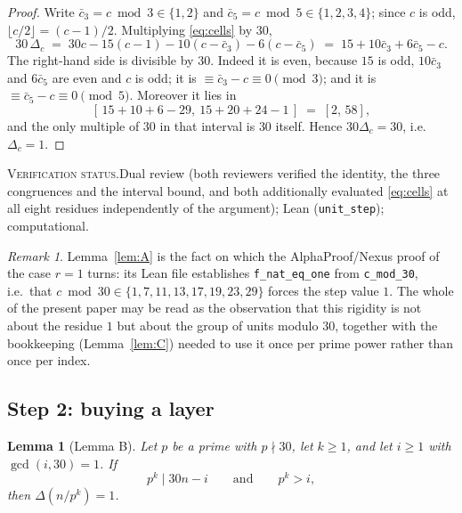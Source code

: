\documentclass[11pt]{article}
\theoremstyle{plain}
\newtheorem{lemma}[theorem]{Lemma}
\theoremstyle{definition}
\theoremstyle{remark}
\newtheorem*{remark}{Remark}
\numberwithin{equation}{section}
\newcommand{\vstatus}[1]{%
  \par\vspace{3pt}\noindent
  {\small\textsc{Verification status.}\enspace #1}\par\vspace{3pt}}
\begin{document}
\begin{proof}
Write $\bar c_3 = c \bmod 3 \in \{1,2\}$ and $\bar c_5 = c \bmod 5 \in \{1,2,3,4\}$; since $c$ is
odd, $\lfloor c/2\rfloor = (c-1)/2$. Multiplying \eqref{eq:cells} by $30$,
\[
  30\,\Delta_c \;=\; 30c - 15(c-1) - 10(c - \bar c_3) - 6(c - \bar c_5)
  \;=\; 15 + 10\bar c_3 + 6\bar c_5 - c .
\]
The right-hand side is divisible by $30$. Indeed it is even, because $15$ is odd, $10\bar c_3$
and $6\bar c_5$ are even and $c$ is odd; it is $\equiv \bar c_3 - c \equiv 0 \pmod 3$; and it is
$\equiv \bar c_5 - c \equiv 0 \pmod 5$. Moreover it lies in
\[
  [\,15 + 10 + 6 - 29,\ 15 + 20 + 24 - 1\,] \;=\; [2,\,58],
\]
and the only multiple of $30$ in that interval is $30$ itself. Hence $30\Delta_c = 30$, i.e.\
$\Delta_c = 1$.
\end{proof}
\vstatus{Dual review (both reviewers verified the identity, the three congruences and the
interval bound, and both additionally evaluated \eqref{eq:cells} at all eight residues
independently of the argument); Lean (\texttt{unit\_step}); computational.}

\begin{remark}
Lemma~\ref{lem:A} is the fact on which the AlphaProof/Nexus proof of the case $r=1$ turns: its
Lean file establishes \texttt{f\_nat\_eq\_one} from \texttt{c\_mod\_30}, i.e.\ that
$c \bmod 30 \in \{1,7,11,13,17,19,23,29\}$ forces the step value $1$. The whole of the present
paper may be read as the observation that this rigidity is not about the residue $1$ but about
the group of units modulo $30$, together with the bookkeeping (Lemma~\ref{lem:C}) needed to use
it once per prime power rather than once per index.
\end{remark}

\subsection{Step 2: buying a layer}

\begin{lemma}[Lemma B]
\label{lem:B}
Let $p$ be a prime with $p \nmid 30$, let $k \ge 1$, and let $i \ge 1$ with $\gcd(i,30)=1$. If
\[
  p^k \mid 30n - i \qquad\text{and}\qquad p^k > i,
\]
then $\Delta(n/p^k) = 1$.
\end{lemma}
\end{document}

